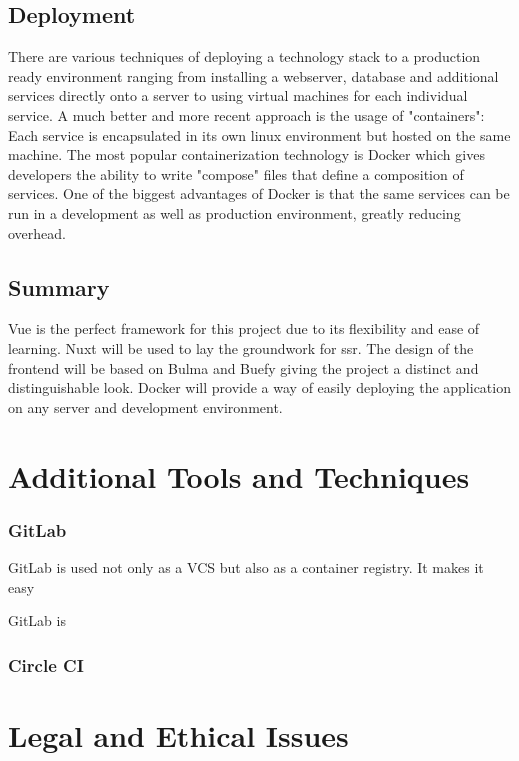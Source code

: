 \subsection{Deployment}
There are various techniques of deploying a technology stack to a production ready environment ranging from installing a webserver, database and additional services directly onto a server to using virtual machines for each individual service. A much better and more recent approach is the usage of "containers": Each service is encapsulated in its own linux environment but hosted on the same machine. The most popular containerization technology is Docker which gives developers the ability to write "compose" files that define a composition of services. One of the biggest advantages of Docker is that the same services can be run in a development as well as production environment, greatly reducing overhead.

\subsection{Summary}
Vue is the perfect framework for this project due to its flexibility and ease of learning. Nuxt will be used to lay the groundwork for \acrshort{ssr}. The design of the frontend will be based on Bulma and Buefy giving the project a distinct and distinguishable look. Docker will provide a way of easily deploying the application on any server and development environment.

\section{Additional Tools and Techniques}
\subsubsection{GitLab}
GitLab is used not only as a VCS but also as a container registry. It makes it easy

GitLab is 

\subsubsection{Circle CI}

\section{Legal and Ethical Issues}